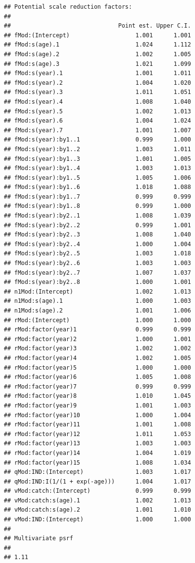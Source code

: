 \documentclass[
]{book}
\begin{document}
\begin{verbatim}
## Potential scale reduction factors:
## 
##                               Point est. Upper C.I.
## fMod:(Intercept)                   1.001      1.001
## fMod:s(age).1                      1.024      1.112
## fMod:s(age).2                      1.002      1.005
## fMod:s(age).3                      1.021      1.099
## fMod:s(year).1                     1.001      1.011
## fMod:s(year).2                     1.004      1.020
## fMod:s(year).3                     1.011      1.051
## fMod:s(year).4                     1.008      1.040
## fMod:s(year).5                     1.002      1.013
## fMod:s(year).6                     1.004      1.024
## fMod:s(year).7                     1.001      1.007
## fMod:s(year):by1..1                0.999      1.000
## fMod:s(year):by1..2                1.003      1.011
## fMod:s(year):by1..3                1.001      1.005
## fMod:s(year):by1..4                1.003      1.013
## fMod:s(year):by1..5                1.005      1.006
## fMod:s(year):by1..6                1.018      1.088
## fMod:s(year):by1..7                0.999      0.999
## fMod:s(year):by1..8                0.999      1.000
## fMod:s(year):by2..1                1.008      1.039
## fMod:s(year):by2..2                0.999      1.001
## fMod:s(year):by2..3                1.008      1.040
## fMod:s(year):by2..4                1.000      1.004
## fMod:s(year):by2..5                1.003      1.018
## fMod:s(year):by2..6                1.003      1.003
## fMod:s(year):by2..7                1.007      1.037
## fMod:s(year):by2..8                1.000      1.001
## n1Mod:(Intercept)                  1.002      1.013
## n1Mod:s(age).1                     1.000      1.003
## n1Mod:s(age).2                     1.001      1.006
## rMod:(Intercept)                   1.000      1.000
## rMod:factor(year)1                 0.999      0.999
## rMod:factor(year)2                 1.000      1.001
## rMod:factor(year)3                 1.002      1.002
## rMod:factor(year)4                 1.002      1.005
## rMod:factor(year)5                 1.000      1.000
## rMod:factor(year)6                 1.005      1.008
## rMod:factor(year)7                 0.999      0.999
## rMod:factor(year)8                 1.010      1.045
## rMod:factor(year)9                 1.001      1.003
## rMod:factor(year)10                1.000      1.004
## rMod:factor(year)11                1.001      1.008
## rMod:factor(year)12                1.011      1.053
## rMod:factor(year)13                1.003      1.003
## rMod:factor(year)14                1.004      1.019
## rMod:factor(year)15                1.008      1.034
## qMod:IND:(Intercept)               1.003      1.017
## qMod:IND:I(1/(1 + exp(-age)))      1.004      1.017
## vMod:catch:(Intercept)             0.999      0.999
## vMod:catch:s(age).1                1.002      1.013
## vMod:catch:s(age).2                1.001      1.010
## vMod:IND:(Intercept)               1.000      1.000
## 
## Multivariate psrf
## 
## 1.11
\end{verbatim}
\end{document}
